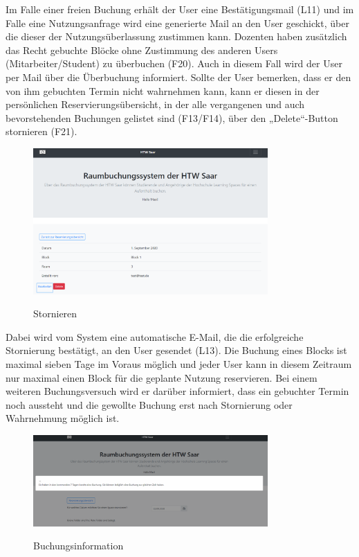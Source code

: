 \documentclass[a4paper,report,headsepline]{scrreprt}
\begin{document}
Im Falle einer freien Buchung erhält der User eine Bestätigungsmail (L11) und im Falle eine Nutzungsanfrage wird eine generierte Mail an den User geschickt, über die dieser der Nutzungsüberlassung zustimmen kann. Dozenten haben zusätzlich das Recht gebuchte Blöcke ohne Zustimmung des anderen Users (Mitarbeiter/Student) zu überbuchen (F20). Auch in diesem Fall wird der User per Mail über die Überbuchung informiert. Sollte der User bemerken, dass er den von ihm gebuchten Termin nicht wahrnehmen kann, kann er diesen in der persönlichen Reservierungsübersicht, in der alle vergangenen und auch bevorstehenden Buchungen gelistet sind (F13/F14), über den „Delete“-Button stornieren (F21).

\begin{figure}[h]
    \centering
    \caption{Stornieren}
    \includegraphics[width=0.8\textwidth]{Stornieren}
    \label{fig:Stornieren}
\end{figure}
Dabei wird vom System eine automatische E-Mail, die die erfolgreiche Stornierung bestätigt, an den User gesendet (L13).
Die Buchung eines Blocks ist maximal sieben Tage im Voraus möglich und jeder User kann in diesem Zeitraum nur maximal einen Block für die geplante Nutzung reservieren. Bei einem weiteren Buchungsversuch wird er darüber informiert, dass ein gebuchter Termin noch aussteht und die gewollte Buchung erst nach Stornierung oder Wahrnehmung möglich ist.
\begin{figure}[h]
    \centering
    \caption{Buchungsinformation}
    \includegraphics[width=0.8\textwidth]{Buchungsinformation}
    \label{fig:Buchungsinformation}
\end{figure}
\end{document}
